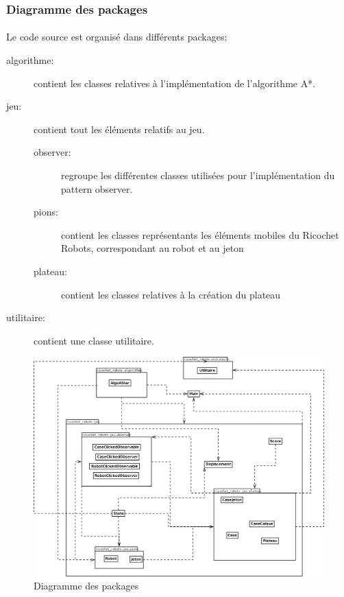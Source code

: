 \documentclass[a4paper, 12pt]{article}
\begin{document}
        \subsubsection{Diagramme des packages}
            
            \paragraph{}
             Le code source est organisé dans différents packages:
             
            \begin{description}
            \item[algorithme:] contient les classes relatives à l'implémentation de l'algorithme A*.
                 \item[jeu:] contient tout les éléments relatifs au jeu.
                 \begin{description}
            	    \item[observer:] regroupe les différentes classes utilisées pour l'implémentation du pattern observer.
            	    \item[pions:] contient les classes représentants les éléments mobiles du Ricochet Robots, correspondant au robot et au jeton  
            	    \item[plateau:] contient les classes relatives à la création du plateau
        	    \end{description}
                 \item[utilitaire:] contient une classe utilitaire.
             \end{description}
             
            \begin{figure}[H]
                \centering
                \includegraphics[scale=0.3]{images/diagrammePackage.png}
                 \caption{Diagramme des packages}
            \end{figure}
\end{document}
